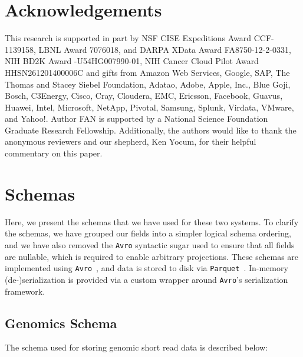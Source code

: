 \documentclass{acm_proc_article-sp}
\begin{document}
\section{Acknowledgements}

This research is supported in part by NSF CISE Expeditions Award CCF-1139158, LBNL Award 7076018, and DARPA XData Award FA8750-12-2-0331, NIH BD2K Award -U54HG007990-01, NIH Cancer Cloud Pilot Award \linebreak HHSN261201400006C and gifts from Amazon Web Services, Google, SAP,  The Thomas and Stacey Siebel Foundation, Adatao, Adobe, Apple, Inc., Blue Goji, Bosch, C3Energy, Cisco, Cray, Cloudera, EMC, Ericsson, Facebook, Guavus, Huawei, Intel, Microsoft, NetApp, Pivotal, Samsung, Splunk, Virdata, VMware, and Yahoo!. Author FAN is supported by a National Science Foundation Graduate Research Fellowship. Additionally, the authors would like to thank the anonymous reviewers and our shepherd, Ken Yocum, for their helpful commentary on this paper.

\balance

\clearpage

\appendix




\section{Schemas}
\label{sec:schema}

Here, we present the schemas that we have used for these two systems. To clarify the schemas, we
have grouped our fields into a simpler logical schema ordering, and we have also removed the \texttt{Avro} syntactic
sugar used to ensure that all fields are nullable, which is required to enable arbitrary
projections. These schemas are implemented using \texttt{Avro}~\cite{avro}, and data is stored to disk via
\texttt{Parquet}~\cite{parquet}. In-memory (de-)serialization is provided via a custom wrapper around \texttt{Avro}'s
serialization framework.

\subsection{Genomics Schema}
\label{sec:genomics-schema}

The schema used for storing genomic short read data is described below:
\end{document}
